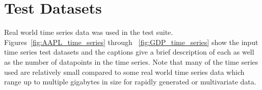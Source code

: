 \documentclass[conference]{IEEEtran}
\begin{document}
\section{Test Datasets}
Real world time series data was used in the test suite.  Figures~\ref{fig:AAPL_time_series} through ~\ref{fig:GDP_time_series} show the input time series test datasets and the captions give a brief description of each as well as the number of datapoints in the time series.  Note that many of the time series used are relatively small compared to some real world time series data which range up to multiple gigabytes in size for rapidly generated or multivariate data.
\end{document}
